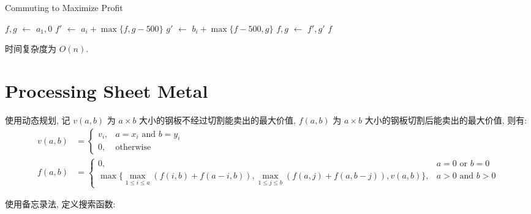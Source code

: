 \documentclass{ctexart}
\newcommand{\Let}[1]{\State #1 $\gets$}
\newcommand{\Ret}[1]{\State \textbf{return} #1}
\begin{document}
\begin{algorithm}[H]
    \caption{Commuting to Maximize Profit}
    \begin{algorithmic}
        \Let{$f, g$} $a_1, 0$
            \Let{$f'$} $a_i + \max\{f, g - 500\}$
            \Let{$g'$} $b_i + \max\{f - 500, g\}$
            \Let{$f, g$} $f', g'$
        \EndFor
        \Ret $f$
        \EndFunction
    \end{algorithmic}
\end{algorithm}

时间复杂度为 $O(n)$.

\section{Processing Sheet Metal} 使用动态规划, 记 $v(a, b)$ 为 $a\times b$ 大小的钢板不经过切割能卖出的最大价值, $f(a, b)$ 为 $a\times b$ 大小的钢板切割后能卖出的最大价值, 则有:
\begin{align*}
    v(a, b) & = \begin{cases}
                    v_i, & a = x_i \text{ and } b = y_i \\
                    0,   & \text{otherwise}
                \end{cases}                                                                                                               \\
    f(a, b) & = \begin{cases}
                    0,                                                                                                                     & a = 0 \text{ or } b = 0  \\
                    \max\{\max\limits_{1 \le i \le a} (f(i, b) + f(a-i, b)), \max\limits_{1 \le j \le b} (f(a, j) + f(a, b-j)), v(a, b)\}, & a > 0 \text{ and } b > 0
                \end{cases}
\end{align*}

使用备忘录法, 定义搜索函数:
\end{document}
